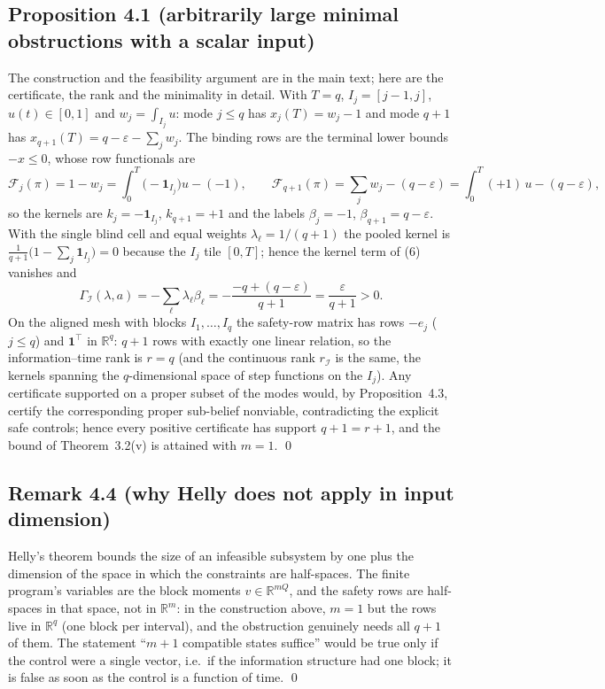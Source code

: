 \documentclass[11pt,a4paper]{article}
\theoremstyle{plain}
\theoremstyle{definition}
\theoremstyle{remark}
\newcommand{\R}{\mathbb{R}}
\newcommand{\calI}{\mathcal{I}}
\newcommand{\calF}{\mathcal{F}}
\newcommand{\Gam}{\Gamma_{\calI}}
\begin{document}
\subsection{Proposition 4.1 (arbitrarily large minimal obstructions with a scalar input)}
The construction and the feasibility argument are in the main text; here are the certificate, the rank and the minimality in detail. With $T=q$, $I_j=[j-1,j]$, $u(t)\in[0,1]$ and $w_j=\int_{I_j}u$: mode $j\le q$ has $x_j(T)=w_j-1$ and mode $q+1$ has $x_{q+1}(T)=q-\varepsilon-\sum_jw_j$. The binding rows are the terminal lower bounds $-x\le0$, whose row functionals are
\[
\calF_j(\pi)=1-w_j=\int_0^T\bigl(-\mathbf 1_{I_j}\bigr)u-(-1),\qquad
\calF_{q+1}(\pi)=\sum_jw_j-(q-\varepsilon)=\int_0^T(+1)\,u-(q-\varepsilon),
\]
so the kernels are $k_j=-\mathbf 1_{I_j}$, $k_{q+1}=+1$ and the labels $\beta_j=-1$, $\beta_{q+1}=q-\varepsilon$. With the single blind cell and equal weights $\lambda_\ell=1/(q+1)$ the pooled kernel is $\frac1{q+1}\bigl(1-\sum_j\mathbf 1_{I_j}\bigr)=0$ because the $I_j$ tile $[0,T]$; hence the kernel term of (6) vanishes and
\[
\Gam(\lambda,a)=-\sum_\ell\lambda_\ell\beta_\ell=-\frac{-q+(q-\varepsilon)}{q+1}=\frac{\varepsilon}{q+1}>0 .
\]
On the aligned mesh with blocks $I_1,\dots,I_q$ the safety-row matrix has rows $-e_j$ ($j\le q$) and $\mathbf 1^\top$ in $\R^q$: $q+1$ rows with exactly one linear relation, so the information--time rank is $r=q$ (and the continuous rank $r_\calI$ is the same, the kernels spanning the $q$-dimensional space of step functions on the $I_j$). Any certificate supported on a proper subset of the modes would, by Proposition~4.3, certify the corresponding proper sub-belief nonviable, contradicting the explicit safe controls; hence every positive certificate has support $q+1=r+1$, and the bound of Theorem~3.2(v) is attained with $m=1$. \qed

\subsection{Remark 4.4 (why Helly does not apply in input dimension)}
Helly's theorem bounds the size of an infeasible subsystem by one plus the dimension of the space in which the constraints are half-spaces. The finite program's variables are the block moments $v\in\R^{mQ}$, and the safety rows are half-spaces in that space, not in $\R^m$: in the construction above, $m=1$ but the rows live in $\R^{q}$ (one block per interval), and the obstruction genuinely needs all $q+1$ of them. The statement ``$m+1$ compatible states suffice'' would be true only if the control were a single vector, i.e.\ if the information structure had one block; it is false as soon as the control is a function of time. \qed
\end{document}
